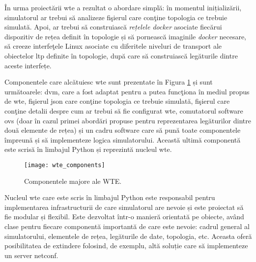 În urma proiectării \gls{wte} a rezultat o abordare simplă: în momentul inițializării, simulatorul ar trebui să analizeze fişierul care conţine topologia ce trebuie simulată. Apoi, ar trebui să construiască \textit{rețelele docker} asociate fiecărui dispozitiv de rețea definit în topologie și să pornească imaginile \textit{docker} necesare, să creeze interfeţele Linux asociate cu diferitele niveluri de transport ale obiectelor \gls{ltp} definite în topologie, după care să construiască legăturile dintre aceste interfețe.

Componentele care alcătuiesc \gls{wte} sunt prezentate în Figura \ref{fig:wte_components} și sunt următoarele: \gls{dvm}, care a fost adaptat pentru a putea funcţiona în mediul propus de \gls{wte}, fişierul \gls{json} care conţine topologia ce trebuie simulată, fişierul care conţine detalii despre cum ar trebui să fie configurat \gls{wte}, comutatorul software \gls{ovs} (doar în cazul primei abordări propuse pentru reprezentarea legăturilor dintre două elemente de rețea) și un cadru software care să pună toate componentele împreună și să implementeze logica simulatorului. Această ultimă componentă este scrisă în limbajul Python și reprezintă nucleul \gls{wte}.

\begin{figure}[h]
	\centering
	\texttt{[image: wte\_components]}
	\caption{Componentele majore ale WTE.}
	\label{fig:wte_components}
\end{figure}

Nucleul \gls{wte} care este scris în limbajul Python este responsabil pentru implementarea infrastructurii de care simulatorul are nevoie și este proiectat să fie modular și flexibil. Este dezvoltat într-o manieră orientată pe obiecte, având clase pentru fiecare componentă importantă de care este nevoie: cadrul general al simulatorului, elementele de rețea, legăturile de date, topologia, etc. Aceasta oferă posibilitatea de extindere folosind, de exemplu, altă soluție care să implementeze un server \gls{netconf}.